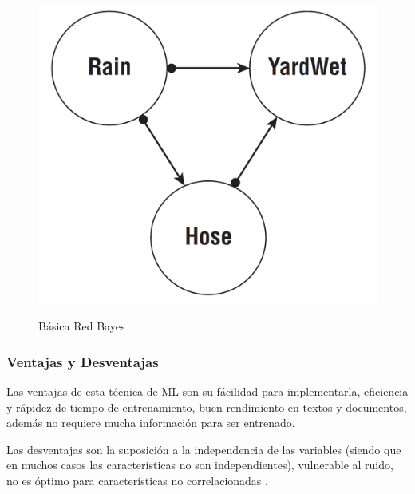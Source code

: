 \begin{figure}[h]
	\centering
	\includegraphics[scale=0.3]{img/Marco Teorico/Redes Bayes.png}  
	\label{fig:Red Bayes}
	\caption{Básica Red Bayes}
\end{figure}

\doublespacing
\subsubsection{Ventajas y Desventajas}
Las ventajas de esta técnica de ML son su fácilidad para implementarla, eficiencia y rápidez de tiempo de entrenamiento, buen rendimiento en textos y documentos, además no requiere mucha información para ser entrenado.\\
\par Las desventajas son la suposición a la independencia de las variables (siendo que en muchos casos las características no son independientes), vulnerable al ruido, no es óptimo para características no correlacionadas \cite{Bell15}.

\doublespacing
